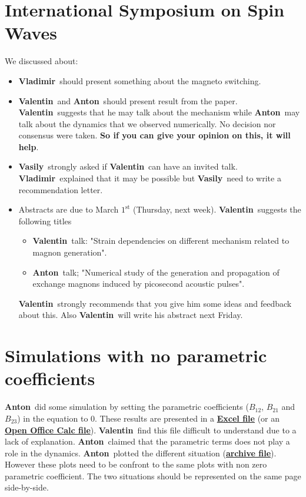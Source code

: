 \documentclass[12pt,a4paper]{article}
\newcommand{\valentin}{\textbf{Valentin}}
\newcommand{\vladimir}{\textbf{Vladimir}}
\newcommand{\anton}{\textbf{Anton}}
\newcommand{\vasily}{\textbf{Vasily}}
\begin{document}
\section{International Symposium on Spin Waves}
\label{sec1}
We discussed about:
\begin{itemize}
    \item \vladimir\ should present something about the magneto switching.
    \item \valentin\ and \anton\ should present result from the paper. \valentin\ suggests that he may talk about the mechanism while \anton\ may talk about the dynamics that we observed numerically. No decision nor consensus were taken. \textbf{So if you can give your opinion on this, it will help}.
    \item \vasily\ strongly asked if \valentin\ can have an invited talk. \vladimir\ explained that it may be possible but \vasily\ need to write a recommendation letter.
    \item Abstracts are due to March $1^{\mathrm{st}}$ (Thursday, next week). \valentin\ suggests the following titles
    \begin{itemize}
        \item \valentin\ talk: "Strain dependencies on different mechanism related to magnon generation".
        \item \anton\ talk; "Numerical study of the generation and propagation of exchange magnons induced by picosecond acoustic pulses".
    \end{itemize}
    \valentin\ strongly recommends that you give him some ideas and feedback about this. 
    Also \valentin\ will write his abstract next Friday.
\end{itemize}

\section{Simulations with no parametric coefficients}
\label{sec2}

\anton\ did some simulation by setting the parametric coefficients ($B_{12}$, $B_{21}$ and $B_{23}$) in the equation to $0$.
These results are presented in a \href{https://www.dropbox.com/s/v2kf5196odk16xt/Comparison\%20wo\%20B-coefs.xlsx?dl=1}{\textbf{Excel file}} (or an \href{https://www.dropbox.com/s/w0yaycigoqlc5ww/Comparison\%20wo\%20B-coefs.ods?dl=1}{\textbf{Open Office Calc file}}).
\valentin\ find this file difficult to understand due to a lack of explanation.
\anton\ claimed that the parametric terms does not play a role in the dynamics.
\anton\ plotted the different situation (\href{https://www.dropbox.com/s/lwe3xghaiqckxjq/plots.zip?dl=1}{\textbf{archive file}}).
However these plots need to be confront to the same plots with non zero parametric coefficient.
The two situations should be represented on the same page side-by-side.
\end{document}
